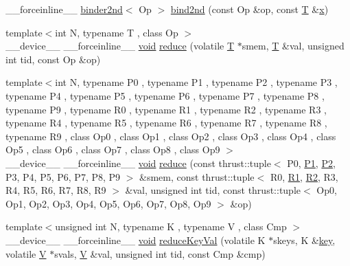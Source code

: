 \begin{DoxyCompactItemize}
\-\_\-\-\_\-forceinline\-\_\-\-\_\- \hyperlink{structcv_1_1gpu_1_1device_1_1binder2nd}{binder2nd}$<$ Op $>$ \hyperlink{namespacecv_1_1gpu_1_1device_a237daae98c74475567786466a97d357a}{bind2nd} (const Op \&op, const \hyperlink{calib3d_8hpp_a3efb9551a871ddd0463079a808916717}{T} \&\hyperlink{highgui__c_8h_a6150e0515f7202e2fb518f7206ed97dc}{x})
\item 
{\footnotesize template$<$int N, typename T , class Op $>$ }\\\-\_\-\-\_\-device\-\_\-\-\_\- \-\_\-\-\_\-forceinline\-\_\-\-\_\- \hyperlink{legacy_8hpp_a8bb47f092d473522721002c86c13b94e}{void} \hyperlink{namespacecv_1_1gpu_1_1device_a5ca6690fdaef50e3247456bc0029663c}{reduce} (volatile \hyperlink{calib3d_8hpp_a3efb9551a871ddd0463079a808916717}{T} $\ast$smem, \hyperlink{calib3d_8hpp_a3efb9551a871ddd0463079a808916717}{T} \&val, unsigned int tid, const Op \&op)
\item 
{\footnotesize template$<$int N, typename P0 , typename P1 , typename P2 , typename P3 , typename P4 , typename P5 , typename P6 , typename P7 , typename P8 , typename P9 , typename R0 , typename R1 , typename R2 , typename R3 , typename R4 , typename R5 , typename R6 , typename R7 , typename R8 , typename R9 , class Op0 , class Op1 , class Op2 , class Op3 , class Op4 , class Op5 , class Op6 , class Op7 , class Op8 , class Op9 $>$ }\\\-\_\-\-\_\-device\-\_\-\-\_\- \-\_\-\-\_\-forceinline\-\_\-\-\_\- \hyperlink{legacy_8hpp_a8bb47f092d473522721002c86c13b94e}{void} \hyperlink{namespacecv_1_1gpu_1_1device_ae15f291b7e1082796aa866b462e4c01b}{reduce} (const thrust\-::tuple$<$ P0, \hyperlink{calib3d_8hpp_a81046431a4ff9a0e8b93536f19efac38}{P1}, \hyperlink{calib3d_8hpp_a704ac1a3954b1c810117417a050e7f76}{P2}, P3, P4, P5, P6, P7, P8, P9 $>$ \&smem, const thrust\-::tuple$<$ R0, \hyperlink{calib3d_8hpp_ab4d5cbb79188a091449ea6430cd5ec59}{R1}, \hyperlink{calib3d_8hpp_a08847b11703596b1db049ef98d450eaa}{R2}, R3, R4, R5, R6, R7, R8, R9 $>$ \&val, unsigned int tid, const thrust\-::tuple$<$ Op0, Op1, Op2, Op3, Op4, Op5, Op6, Op7, Op8, Op9 $>$ \&op)
\item 
{\footnotesize template$<$unsigned int N, typename K , typename V , class Cmp $>$ }\\\-\_\-\-\_\-device\-\_\-\-\_\- \-\_\-\-\_\-forceinline\-\_\-\-\_\- \hyperlink{legacy_8hpp_a8bb47f092d473522721002c86c13b94e}{void} \hyperlink{namespacecv_1_1gpu_1_1device_a7c4513642073faf3329418d143e84581}{reduce\-Key\-Val} (volatile K $\ast$skeys, K \&\hyperlink{core__c_8h_a68cf695b604d08c0b6f6f6bb282a6586}{key}, volatile \hyperlink{core__c_8h_ad8dd4fff0e3910932187b6de0543cae1}{V} $\ast$svals, \hyperlink{core__c_8h_ad8dd4fff0e3910932187b6de0543cae1}{V} \&val, unsigned int tid, const Cmp \&cmp)

\end{DoxyCompactItemize}
